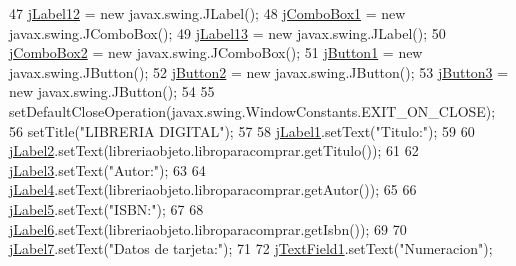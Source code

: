 \begin{DoxyCode}
47         \mbox{\hyperlink{class_interfaz_package_1_1_verificar_libro_abc6a3ed061a0f7f051470750826cda02}{jLabel12}} = \textcolor{keyword}{new} javax.swing.JLabel();
48         \mbox{\hyperlink{class_interfaz_package_1_1_verificar_libro_a5f8fd3453828fec1a8baafb3788ee5c6}{jComboBox1}} = \textcolor{keyword}{new} javax.swing.JComboBox();
49         \mbox{\hyperlink{class_interfaz_package_1_1_verificar_libro_a46332053f952c0ec6ca5dc7b744e135d}{jLabel13}} = \textcolor{keyword}{new} javax.swing.JLabel();
50         \mbox{\hyperlink{class_interfaz_package_1_1_verificar_libro_a6e3256102994e7764c50c7a37aebc859}{jComboBox2}} = \textcolor{keyword}{new} javax.swing.JComboBox();
51         \mbox{\hyperlink{class_interfaz_package_1_1_verificar_libro_a5795c2ef06a892f54b964cccdaa87bac}{jButton1}} = \textcolor{keyword}{new} javax.swing.JButton();
52         \mbox{\hyperlink{class_interfaz_package_1_1_verificar_libro_a35a502b6b4c12dee0f50c5409271d275}{jButton2}} = \textcolor{keyword}{new} javax.swing.JButton();
53         \mbox{\hyperlink{class_interfaz_package_1_1_verificar_libro_a71325c9a930cd968c2b6ce4abc7e8129}{jButton3}} = \textcolor{keyword}{new} javax.swing.JButton();
54 
55         setDefaultCloseOperation(javax.swing.WindowConstants.EXIT\_ON\_CLOSE);
56         setTitle(\textcolor{stringliteral}{"LIBRERIA DIGITAL"});
57 
58         \mbox{\hyperlink{class_interfaz_package_1_1_verificar_libro_ae036e1136fd3ea0a459815b6fbad2974}{jLabel1}}.setText(\textcolor{stringliteral}{"Titulo:"});
59 
60         \mbox{\hyperlink{class_interfaz_package_1_1_verificar_libro_ae1649adac4d57368e1c269c7dfa7ea8e}{jLabel2}}.setText(libreriaobjeto.libroparacomprar.getTitulo());
61 
62         \mbox{\hyperlink{class_interfaz_package_1_1_verificar_libro_a07f26adefc6f29a9f6335d4eceac2a96}{jLabel3}}.setText(\textcolor{stringliteral}{"Autor:"});
63 
64         \mbox{\hyperlink{class_interfaz_package_1_1_verificar_libro_a3df20770732e9526771c5a14aa5afb6a}{jLabel4}}.setText(libreriaobjeto.libroparacomprar.getAutor());
65 
66         \mbox{\hyperlink{class_interfaz_package_1_1_verificar_libro_af0ca29553abca825c883eacf5e075ce6}{jLabel5}}.setText(\textcolor{stringliteral}{"ISBN:"});
67 
68         \mbox{\hyperlink{class_interfaz_package_1_1_verificar_libro_a5ed33c5473e49a9a27a02f94f1152818}{jLabel6}}.setText(libreriaobjeto.libroparacomprar.getIsbn());
69 
70         \mbox{\hyperlink{class_interfaz_package_1_1_verificar_libro_a6e28a406ea8abbcc35d06c8ea648882c}{jLabel7}}.setText(\textcolor{stringliteral}{"Datos de tarjeta:"});
71 
72         \mbox{\hyperlink{class_interfaz_package_1_1_verificar_libro_a0056a9edc1fada73cb6c0ce0ec712df0}{jTextField1}}.setText(\textcolor{stringliteral}{"Numeracion"});

\end{DoxyCode}
